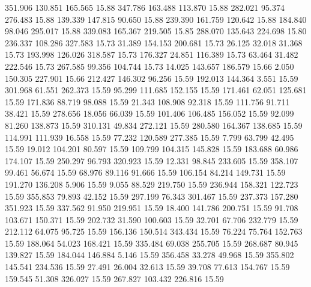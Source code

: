  351.906  130.851  165.565        15.88
 347.786  163.488  113.870        15.88
 282.021   95.374  276.483        15.88
 139.339  147.815   90.650        15.88
 239.390  161.759  120.642        15.88
 184.840   98.046  295.017        15.88
 339.083  165.367  219.505        15.85
 288.070  135.643  224.698        15.80
 236.337  108.286  327.583        15.73
  31.389  154.153  200.681        15.73
  26.125   32.018   31.368        15.73
 193.998  126.026  318.587        15.73
 176.327   24.851  116.389        15.73
  63.464   31.482  222.546        15.73
 267.585   99.356  104.744        15.73
  14.025  143.657  186.579        15.66
   2.050  150.305  227.901        15.66
 212.427  146.302   96.256        15.59
 192.013  144.364    3.551        15.59
 301.968   61.551  262.373        15.59
  95.299  111.685  152.155        15.59
 171.461   62.051  125.681        15.59
 171.836   88.719   98.088        15.59
  21.343  108.908   92.318        15.59
 111.756   91.711   38.421        15.59
 278.656   18.056   66.039        15.59
 101.406  106.485  156.052        15.59
  92.099   81.260  138.873        15.59
 310.131   49.834  272.121        15.59
 280.580  164.367  138.685        15.59
 114.991  111.939   16.558        15.59
  77.232  120.589  277.385        15.59
   7.799   63.799   42.495        15.59
  19.012  104.201   80.597        15.59
 109.799  104.315  145.828        15.59
 183.688   60.986  174.107        15.59
 250.297   96.793  320.923        15.59
  12.331   98.845  233.605        15.59
 358.107   99.461   56.674        15.59
  68.976   89.116   91.666        15.59
 106.154   84.214  149.731        15.59
 191.270  136.208    5.906        15.59
   9.055   88.529  219.750        15.59
 236.944  158.321  122.723        15.59
 355.853   79.893   42.152        15.59
 297.199   76.343  301.467        15.59
 237.373  157.280  351.923        15.59
 337.562   91.950  219.951        15.59
  18.400  141.786  200.751        15.59
  91.708  103.671  150.371        15.59
 202.732   31.590  100.603        15.59
  32.701   67.706  232.779        15.59
 212.112   64.075   95.725        15.59
 156.136  150.514  343.434        15.59
  76.224   75.764  152.763        15.59
 188.064   54.023  168.421        15.59
 335.484   69.038  255.705        15.59
 268.687   80.945  139.827        15.59
 184.044  146.884    5.146        15.59
 356.458   33.278   49.968        15.59
 355.802  145.541  234.536        15.59
  27.491   26.004   32.613        15.59
  39.708   77.613  154.767        15.59
 159.545   51.308  326.027        15.59
 267.827  103.432  226.816        15.59
